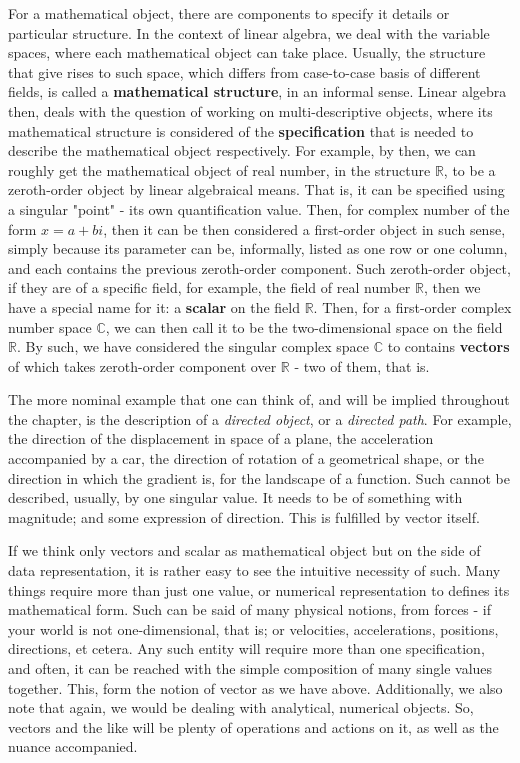 For a mathematical object, there are components to specify it details or particular structure. In the context of linear algebra, we deal with the variable spaces, where each mathematical object can take place. Usually, the structure that give rises to such space, which differs from case-to-case basis of different fields, is called a \textbf{mathematical structure}, in an informal sense. Linear algebra then, deals with the question of working on multi-descriptive objects, where its mathematical structure is considered of the \textbf{specification} that is needed to describe the mathematical object respectively. For example, by then, we can roughly get the mathematical object of real number, in the structure $\mathbb{R}$, to be a zeroth-order object by linear algebraical means. That is, it can be specified using a singular "point" - its own quantification value. Then, for complex number of the form $x= a+ bi$, then it can be then considered a first-order object in such sense, simply because its parameter can be, informally, listed as one row or one column, and each contains the previous zeroth-order component. Such zeroth-order object, if they are of a specific field, for example, the field of real number $\mathbb{R}$, then we have a special name for it: a \textbf{scalar} on the field $\mathbb{R}$. Then, for a first-order complex number space $\mathbb{C}$, we can then call it to be the two-dimensional space on the field $\mathbb{R}$. By such, we have considered the singular complex space $\mathbb{C}$ to contains \textbf{vectors} of which takes zeroth-order component over $\mathbb{R}$ - two of them, that is. 

The more nominal example that one can think of, and will be implied throughout the chapter, is the description of a \textit{directed object}, or a \textit{directed path}. For example, the direction of the displacement in space of a plane, the acceleration accompanied by a car, the direction of rotation of a geometrical shape, or the direction in which the gradient is, for the landscape of a function. Such cannot be described, usually, by one singular value. It needs to be of something with magnitude; and some expression of direction. This is fulfilled by vector itself. 

If we think only vectors and scalar as mathematical object but on the side of data representation, it is rather easy to see the intuitive necessity of such. Many things require more than just one value, or numerical representation to defines its mathematical form. Such can be said of many physical notions, from forces - if your world is not one-dimensional, that is; or velocities, accelerations, positions, directions, et cetera. Any such entity will require more than one specification, and often, it can be reached with the simple composition of many single values together. This, form the notion of vector as we have above. Additionally, we also note that again, we would be dealing with analytical, numerical objects. So, vectors and the like will be plenty of operations and actions on it, as well as the nuance accompanied. 

